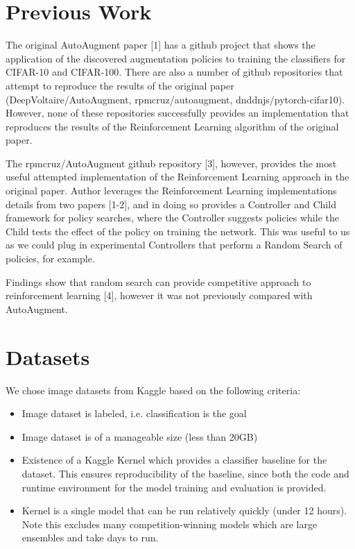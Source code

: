 \documentclass[10pt,twocolumn,letterpaper]{article}
\begin{document}
\section{Previous Work}

The original AutoAugment paper [1] has a github project that shows the application of the discovered augmentation policies to training the classifiers for CIFAR-10 and CIFAR-100.  There are also a number of github repositories that attempt to reproduce the results of the original paper (DeepVoltaire/AutoAugment, rpmcruz/autoaugment, dnddnjs/pytorch-cifar10).  However, none of these repositories successfully provides an implementation that reproduces the results of the Reinforcement Learning algorithm of the original paper.

The rpmcruz/AutoAugment github repository [3], however, provides the most useful attempted implementation of the Reinforcement Learning approach in the original paper.  Author leverages the Reinforcement Learning implementations details from two papers [1-2], and in doing so provides a Controller and Child framework for policy searches, where the Controller suggests policies while the Child tests the effect of the policy on training the network.  This was useful to us as we could plug in experimental Controllers that perform a Random Search of policies, for example.

Findings show that random search can provide competitive approach to reinforcement learning [4], however it was not previously compared with AutoAugment.

\section{Datasets}

We chose image datasets from Kaggle based on the following criteria:

\begin{itemize}
  \item Image dataset is labeled, i.e. classification is the goal
  \item Image dataset is of a manageable size (less than 20GB)
  \item Existence of a Kaggle Kernel which provides a classifier baseline for the dataset. This ensures reproducibility of the baseline, since both the code and runtime environment for the model training and evaluation is provided.
  \item Kernel is a single model that can be run relatively quickly (under 12 hours).  Note this excludes many competition-winning models which are large ensembles and take days to run.
\end{itemize}
\end{document}
